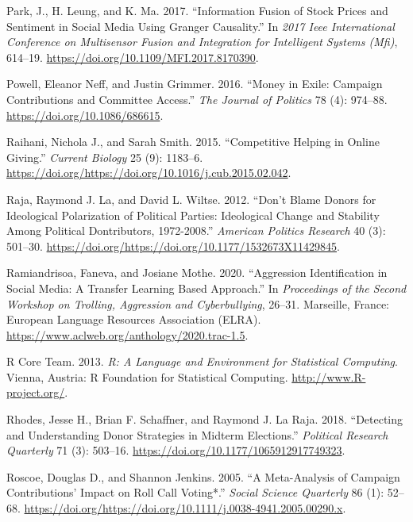 \documentclass[12pt,]{article}
\begin{document}
\leavevmode\hypertarget{ref-park2017}{}%
Park, J., H. Leung, and K. Ma. 2017. ``Information Fusion of Stock
Prices and Sentiment in Social Media Using Granger Causality.'' In
\emph{2017 Ieee International Conference on Multisensor Fusion and
Integration for Intelligent Systems (Mfi)}, 614--19.
\url{https://doi.org/10.1109/MFI.2017.8170390}.

\leavevmode\hypertarget{ref-powell2016}{}%
Powell, Eleanor Neff, and Justin Grimmer. 2016. ``Money in Exile:
Campaign Contributions and Committee Access.'' \emph{The Journal of
Politics} 78 (4): 974--88. \url{https://doi.org/10.1086/686615}.

\leavevmode\hypertarget{ref-raihani2015}{}%
Raihani, Nichola J., and Sarah Smith. 2015. ``Competitive Helping in
Online Giving.'' \emph{Current Biology} 25 (9): 1183--6.
\url{https://doi.org/https://doi.org/10.1016/j.cub.2015.02.042}.

\leavevmode\hypertarget{ref-laraja2012}{}%
Raja, Raymond J. La, and David L. Wiltse. 2012. ``Don't Blame Donors for
Ideological Polarization of Political Parties: Ideological Change and
Stability Among Political Dontributors, 1972-2008.'' \emph{American
Politics Research} 40 (3): 501--30.
\url{https://doi.org/https://doi.org/10.1177/1532673X11429845}.

\leavevmode\hypertarget{ref-ramiandrisoa2020}{}%
Ramiandrisoa, Faneva, and Josiane Mothe. 2020. ``Aggression
Identification in Social Media: A Transfer Learning Based Approach.'' In
\emph{Proceedings of the Second Workshop on Trolling, Aggression and
Cyberbullying}, 26--31. Marseille, France: European Language Resources
Association (ELRA).
\url{https://www.aclweb.org/anthology/2020.trac-1.5}.

\leavevmode\hypertarget{ref-r}{}%
R Core Team. 2013. \emph{R: A Language and Environment for Statistical
Computing}. Vienna, Austria: R Foundation for Statistical Computing.
\url{http://www.R-project.org/}.

\leavevmode\hypertarget{ref-rhodes2018}{}%
Rhodes, Jesse H., Brian F. Schaffner, and Raymond J. La Raja. 2018.
``Detecting and Understanding Donor Strategies in Midterm Elections.''
\emph{Political Research Quarterly} 71 (3): 503--16.
\url{https://doi.org/10.1177/1065912917749323}.

\leavevmode\hypertarget{ref-roscoe2005}{}%
Roscoe, Douglas D., and Shannon Jenkins. 2005. ``A Meta-Analysis of
Campaign Contributions' Impact on Roll Call Voting*.'' \emph{Social
Science Quarterly} 86 (1): 52--68.
\url{https://doi.org/https://doi.org/10.1111/j.0038-4941.2005.00290.x}.
\end{document}
